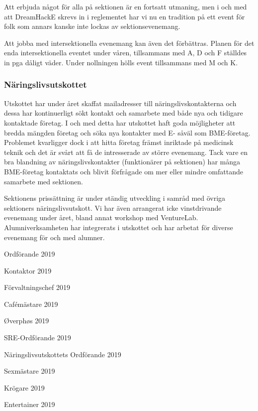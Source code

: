 \documentclass[../_main/handlingar.tex]{subfiles}
\begin{document}
Att erbjuda något för alla på sektionen är en fortsatt utmaning, men i och med att DreamHackE skrevs in i reglementet har vi nu en tradition på ett event för folk som annars kanske inte lockas av sektionsevenemang. 

Att jobba med intersektionella evenemang kan även det förbättras. Planen för det enda intersektionella eventet under våren, tillsammans med A, D och F ställdes in pga dåligt väder. Under nollningen hölls event tillsammans med M och K. 

\subsubsection*{Näringslivsutskottet}

Utskottet har under året skaffat mailadresser till näringslivskontakterna och dessa har kontinuerligt sökt kontakt och samarbete med både nya och tidigare kontaktade företag. I och med detta har utskottet haft goda möjligheter att bredda mängden företag och söka nya kontakter med E- såväl som BME-företag. 
Problemet kvarligger dock i att hitta företag främst inriktade på medicinsk teknik och det är svårt att få de intresserade av större evenemang. Tack vare en bra blandning av näringslivskontakter (funktionärer på sektionen) har många BME-företag kontaktats och blivit förfrågade om mer eller mindre omfattande samarbete med sektionen.

Sektionens prissättning är under ständig utveckling i samråd med övriga sektioners näringslivsutskott. Vi har även arrangerat icke vinstdrivande evenemang under året, bland annat workshop med VentureLab. Alumniverksamheten har integrerats i utskottet och har arbetat för diverse evenemang för och med alumner. 


\newpage
\begin{signatures}{10}
    \mvh
    \signature{\ordf}{Ordförande 2019}
    \signature{\sekr}{Kontaktor 2019}
    \signature{\fvc}{Förvaltningschef 2019}
    \signature{\cafem}{Cafémästare 2019}
    \signature{\oph}{Øverphøs 2019}
    \signature{\sreordf}{SRE-Ordförande 2019}
    \signature{\enuordf}{Näringslivsutskottets Ordförande 2019}
    \signature{\sexm}{Sexmästare 2019}
    \signature{\krog}{Krögare 2019}
    \signature{\ent}{Entertainer 2019}
\end{signatures}
\end{document}
